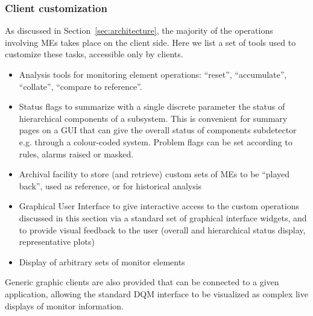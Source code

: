 \documentclass[a4paper]{cmspaper}
\begin{document}
\subsubsection{Client customization}
\label{sec:dqm:tools}
%
As discussed in Section~\ref{sec:architecture}, the majority of the operations
involving MEs takes place on the client side. Here we list
a set of tools used to customize these tasks, accessible only by
clients.
\begin{itemize}
\item{Analysis tools for monitoring element operations:
``reset'', ``accumulate'', ``collate'', ``compare to reference''.}
\item{Status flags to summarize with a single discrete parameter the status of hierarchical
components of a subsystem. This is convenient for
summary pages on a GUI that can give the overall status of components
subdetector e.g. through a colour-coded system. Problem flags
can be set according to rules, alarms raised or masked.}
%
\item{Archival facility to store (and retrieve) custom sets of MEs to be
``played back'', used as reference, or for historical analysis}
%
\item{Graphical User Interface to give interactive access to
the custom operations discussed in this section via a standard set of
graphical interface widgets, and to provide visual feedback to the user (overall and
hierarchical status display, representative plots)}

\item{Display of arbitrary sets of monitor elements}

\end{itemize}
Generic graphic clients are also provided that can be connected to a
given application, 
allowing the standard DQM interface to be visualized as complex live displays of monitor
information.
%
%
%
\end{document}
